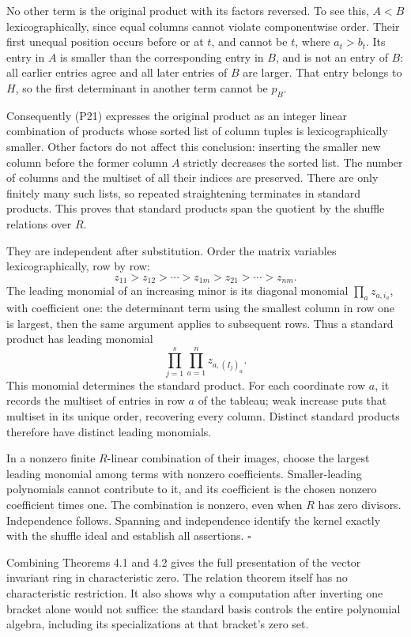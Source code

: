 \documentclass[
]{article}
\begin{document}
No other term is the original product with its factors reversed. To see
this, \(A<B\) lexicographically, since equal columns cannot violate
componentwise order. Their first unequal position occurs before or at
\(t\), and cannot be \(t\), where \(a_t>b_t\). Its entry in \(A\) is
smaller than the corresponding entry in \(B\), and is not an entry of
\(B\): all earlier entries agree and all later entries of \(B\) are
larger. That entry belongs to \(H\), so the first determinant in another
term cannot be \(p_B\).

Consequently (P21) expresses the original product as an integer linear
combination of products whose sorted list of column tuples is
lexicographically smaller. Other factors do not affect this conclusion:
inserting the smaller new column before the former column \(A\) strictly
decreases the sorted list. The number of columns and the multiset of all
their indices are preserved. There are only finitely many such lists, so
repeated straightening terminates in standard products. This proves that
standard products span the quotient by the shuffle relations over \(R\).

They are independent after substitution. Order the matrix variables
lexicographically, row by row: \[
z_{11}>z_{12}>\cdots>z_{1m}>
z_{21}>\cdots>z_{nm}.
\] The leading monomial of an increasing minor is its diagonal monomial
\(\prod_a z_{a,i_a}\), with coefficient one: the determinant term using
the smallest column in row one is largest, then the same argument
applies to subsequent rows. Thus a standard product has leading monomial
\[
\prod_{j=1}^s\prod_{a=1}^n z_{a,(I_j)_a}.
\] This monomial determines the standard product. For each coordinate
row \(a\), it records the multiset of entries in row \(a\) of the
tableau; weak increase puts that multiset in its unique order,
recovering every column. Distinct standard products therefore have
distinct leading monomials.

In a nonzero finite \(R\)-linear combination of their images, choose the
largest leading monomial among terms with nonzero coefficients.
Smaller-leading polynomials cannot contribute to it, and its coefficient
is the chosen nonzero coefficient times one. The combination is nonzero,
even when \(R\) has zero divisors. Independence follows. Spanning and
independence identify the kernel exactly with the shuffle ideal and
establish all assertions. \(\square\)

Combining Theorems 4.1 and 4.2 gives the full presentation of the vector
invariant ring in characteristic zero. The relation theorem itself has
no characteristic restriction. It also shows why a computation after
inverting one bracket alone would not suffice: the standard basis
controls the entire polynomial algebra, including its specializations at
that bracket's zero set.
\end{document}
